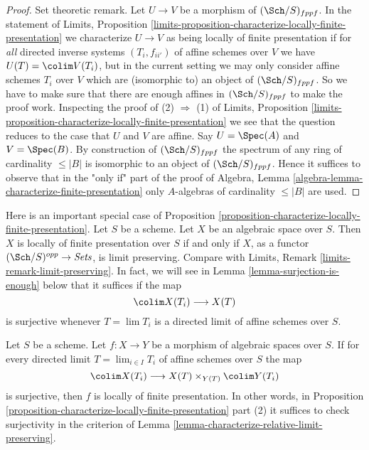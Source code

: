 \begin{proof}
\medskip\noindent
Set theoretic remark. Let $U \to V$ be a morphism of
$(\Sch/S)_{fppf}$. In the statement of
Limits, Proposition
\ref{limits-proposition-characterize-locally-finite-presentation}
we characterize $U \to V$ as being locally of finite presentation
if for {\it all} directed inverse systems $(T_i, f_{ii'})$ of affine schemes
over $V$ we have $U(T) = \colim V(T_i)$, but in the current setting
we may only consider affine schemes $T_i$ over $V$ which are (isomorphic to)
an object of $(\Sch/S)_{fppf}$. So we have to make sure that there
are enough affines in $(\Sch/S)_{fppf}$ to make the proof work.
Inspecting the proof of (2) $\Rightarrow$ (1) of
Limits, Proposition
\ref{limits-proposition-characterize-locally-finite-presentation}
we see that the question reduces to the case that $U$ and $V$ are affine.
Say $U = \Spec(A)$ and $V = \Spec(B)$. By construction
of $(\Sch/S)_{fppf}$ the spectrum of any ring of cardinality
$\leq |B|$ is isomorphic to an object of $(\Sch/S)_{fppf}$.
Hence it suffices to observe that in the "only if" part of the proof of
Algebra, Lemma \ref{algebra-lemma-characterize-finite-presentation}
only $A$-algebras of cardinality $\leq |B|$ are used.
\end{proof}

\begin{remark}
\label{remark-limit-preserving}
Here is an important special case of
Proposition \ref{proposition-characterize-locally-finite-presentation}.
Let $S$ be a scheme. Let $X$ be an algebraic space over $S$.
Then $X$ is locally of finite presentation over $S$ if and only
if $X$, as a functor $(\Sch/S)^{opp} \to \textit{Sets}$,
is limit preserving. Compare with
Limits, Remark \ref{limits-remark-limit-preserving}.
In fact, we will see in Lemma \ref{lemma-surjection-is-enough}
below that it suffices if the map
$$
\colim X(T_i) \longrightarrow X(T)
$$
is surjective whenever $T = \lim T_i$ is a directed limit of
affine schemes over $S$.
\end{remark}

\begin{lemma}
\label{lemma-surjection-is-enough}
Let $S$ be a scheme.
Let $f : X \to Y$ be a morphism of algebraic spaces over $S$.
If for every directed limit $T = \lim_{i \in I} T_i$
of affine schemes over $S$ the map
$$
\colim X(T_i) \longrightarrow X(T) \times_{Y(T)} \colim Y(T_i)
$$
is surjective, then $f$ is locally of finite presentation.
In other words, in
Proposition \ref{proposition-characterize-locally-finite-presentation}
part (2) it suffices to check surjectivity in the criterion of
Lemma \ref{lemma-characterize-relative-limit-preserving}.
\end{lemma}

